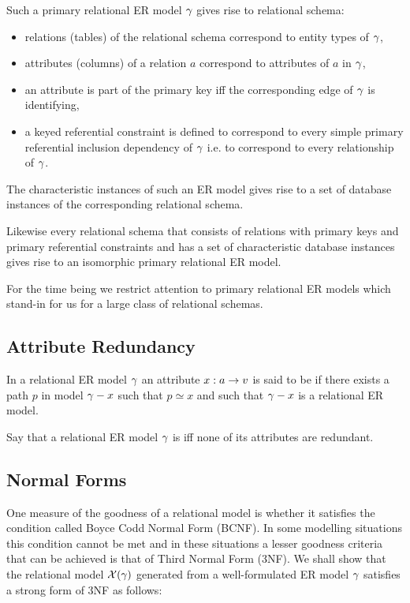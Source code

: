 Such a primary relational ER model $\gamma$ gives rise to relational schema:
\begin{itemize}
\item relations (tables) of the relational schema correspond to entity types of $\gamma$,
\item attributes (columns) of a relation $a$ correspond to attributes of $a$ in $\gamma$, 
\item an attribute is part of the primary key iff the corresponding edge of $\gamma$ is identifying,
\item a keyed referential constraint is defined to correspond to every simple primary referential inclusion dependency of $\gamma$ i.e. to correspond to every relationship of $\gamma$. 
\end{itemize}

The characteristic instances of such an ER model gives rise to a set of database instances of the corresponding relational schema.

Likewise every relational schema that consists of relations with primary keys and primary referential constraints and has a set of characteristic database instances gives rise to an isomorphic primary relational ER model. 

For the time being we restrict attention to primary relational ER models which stand-in for us for a large class of relational schemas. 

\subsection{Attribute Redundancy}
\begin{definition}
In a relational ER model $\gamma$ an attribute $x: a \rightarrow v$ is said to be  if
there exists a path $p$ in model $\gamma - x$ such that $p \simeq x$ and such that $\gamma - x$ is 
a relational ER model.  
\end{definition}
\begin{definition}
Say that a relational ER model $\gamma$ is  iff none of its attributes are redundant.
\end{definition}


\subsection{Normal Forms}

\noindent One measure of the goodness of a relational model is whether it satisfies the condition called Boyce Codd Normal Form (BCNF). In some modelling situations this condition cannot be 
met and in these situations a lesser goodness criteria that can be achieved is that of Third Normal Form (3NF). We shall show that the relational model $\mathcal{X}(\gamma)$ generated from a well-formulated 
ER model $\gamma$ satisfies a strong form of 3NF as follows:

